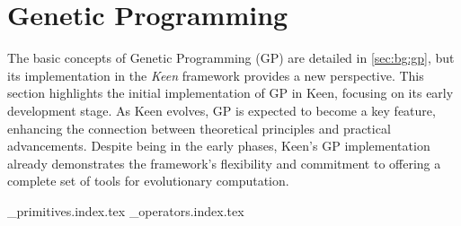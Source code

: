 
\section{Genetic Programming}
\label{sec:keen:gp}
    The basic concepts of Genetic Programming (GP) are detailed in \vref{sec:bg:gp}, but its implementation in the 
    \textit{Keen} framework provides a new perspective. This section highlights the initial implementation of GP in 
    Keen, focusing on its early development stage. As Keen evolves, GP is expected to become a key feature, enhancing 
    the connection between theoretical principles and practical advancements. Despite being in the early phases, Keen's 
    GP implementation already demonstrates the framework's flexibility and commitment to offering a complete set of 
    tools for evolutionary computation.

    {_primitives.index.tex}
    {_operators.index.tex}